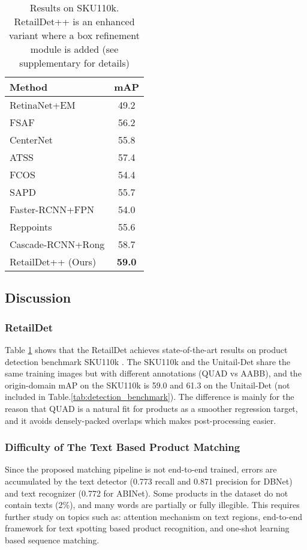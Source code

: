 \documentclass[runningheads]{llncs}
\begin{document}
\begin{table}[t]
\begin{minipage}{0.48\columnwidth}
    \caption{Results on SKU110k. RetailDet++ is an enhanced variant where a box refinement module is added (see supplementary for details)}
    \begin{tabular}{l|c}
    \hline \hline
    Method          & mAP    \\ \hline
    RetinaNet+EM\cite{SKU110k}   &  49.2  \\
    FSAF    \cite{Zhu_2019_CVPR}         &  56.2  \\
    CenterNet  \cite{duan2019centernet} & 55.8    \\  
    ATSS    \cite{zhang2020bridging}         & 57.4    \\
    FCOS    \cite{tian2019fcos}        & 54.4    \\
    SAPD    \cite{zhu2020soft}        & 55.7    \\
    Faster-RCNN+FPN     \cite{ren2015faster}     &54.0  \\
    Reppoints       \cite{reppoints}   &55.6   \\ 
    Cascade-RCNN+Rong \cite{rong2021solution}  &58.7    \\ \hline
    RetailDet++ (Ours)         &\textbf{59.0}   \\
    \hline
    \end{tabular}
    \label{table_sku110k}
    \end{minipage}
    
\end{table}

\subsection{Discussion}
\subsubsection{RetailDet} Table \ref{table_sku110k} shows that the RetailDet achieves state-of-the-art results on product detection benchmark SKU110k \cite{SKU110k}. The SKU110k and the Unitail-Det share the same training images but with different annotations (QUAD vs AABB), and the origin-domain mAP on the SKU110k is 59.0 and 61.3 on the Unitail-Det (not included in Table.\ref{tab:detection_benchmark}). The difference is mainly for the reason that QUAD is a natural fit for products as a smoother regression target, and it avoids densely-packed overlaps which makes post-processing easier. 
\subsubsection{Difficulty of The Text Based Product Matching} Since the proposed matching pipeline is not end-to-end trained, errors are accumulated by the text detector (0.773 recall and 0.871 precision for DBNet) and text recognizer (0.772 for ABINet). Some products in the dataset do not contain texts (2\%), and many words are partially or fully illegible. This requires further study on topics such as: attention mechanism on text regions, end-to-end framework for text spotting based product recognition, and one-shot learning based sequence matching. 
\end{document}
